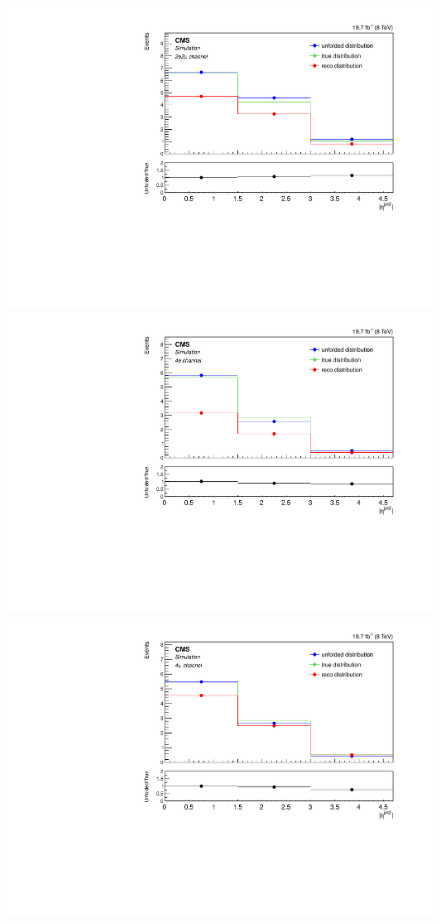 \begin{figure}[hbtp]
\begin{center}
    \includegraphics[width=0.8\cmsFigWidth]{Figures/Unfolding/MCTests/EtaJet2_ZZTo2e2m_MadMatrix_PowDistr_FullSample_fr}
     \includegraphics[width=0.8\cmsFigWidth]{Figures/Unfolding/MCTests/EtaJet2_ZZTo4e_PowMatrix_MadDistr_FullSample_fr}     
    \includegraphics[width=0.8\cmsFigWidth]{Figures/Unfolding/MCTests/EtaJet2_ZZTo4m_PowMatrix_MadDistr_FullSample_fr}     

\end{center}
\end{figure}
